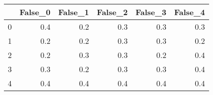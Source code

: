 \begin{tabular}{lrrrrr}
\toprule
{} &  False\_0 &  False\_1 &  False\_2 &  False\_3 &  False\_4 \\ \hline
\midrule
0 &      0.4 &      0.2 &      0.3 &      0.3 &      0.3 \\ \hline
1 &      0.2 &      0.2 &      0.3 &      0.3 &      0.2 \\ \hline
2 &      0.2 &      0.3 &      0.3 &      0.2 &      0.4 \\ \hline
3 &      0.3 &      0.2 &      0.3 &      0.3 &      0.4 \\ \hline
4 &      0.4 &      0.4 &      0.4 &      0.4 &      0.4 \\ \hline
\bottomrule
\end{tabular}
